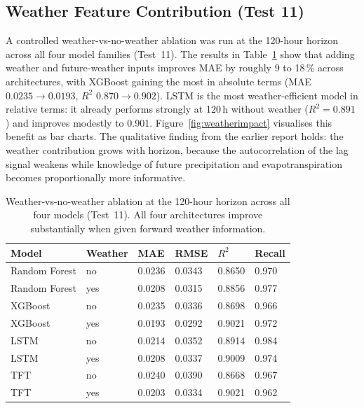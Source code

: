 \documentclass[12pt, a4paper]{article}
\begin{document}
\subsection{Weather Feature Contribution (Test 11)}

A controlled weather-vs-no-weather ablation was run at the 120-hour horizon
across all four model families (Test~11). The results in
Table~\ref{tab:weather_ablation} show that adding weather and future-weather
inputs improves MAE by roughly 9 to 18\,\% across architectures, with XGBoost
gaining the most in absolute terms (MAE $0.0235 \to 0.0193$, $R^2$
$0.870 \to 0.902$). LSTM is the most weather-efficient model in relative
terms: it already performs strongly at 120\,h without weather ($R^2 = 0.891$)
and improves modestly to 0.901. Figure~\ref{fig:weatherimpact} visualises this
benefit as bar charts. The qualitative finding from the earlier report holds:
the weather contribution grows with horizon, because the autocorrelation of
the lag signal weakens while knowledge of future precipitation and
evapotranspiration becomes proportionally more informative.

\begin{table}[H]
\centering
\caption{Weather-vs-no-weather ablation at the 120-hour horizon across all
four models (Test~11). All four architectures improve substantially when given
forward weather information.}
\label{tab:weather_ablation}
\begin{tabularx}{\linewidth}{lXXXXX}
\toprule
\textbf{Model} & \textbf{Weather} & \textbf{MAE} & \textbf{RMSE} & \textbf{$R^2$} & \textbf{Recall} \\
\midrule
Random Forest & no  & 0.0236 & 0.0343 & 0.8650 & 0.970 \\
Random Forest & yes & 0.0208 & 0.0315 & 0.8856 & 0.977 \\
XGBoost       & no  & 0.0235 & 0.0336 & 0.8698 & 0.966 \\
XGBoost       & yes & 0.0193 & 0.0292 & 0.9021 & 0.972 \\
LSTM          & no  & 0.0214 & 0.0352 & 0.8914 & 0.984 \\
LSTM          & yes & 0.0208 & 0.0337 & 0.9009 & 0.974 \\
TFT           & no  & 0.0240 & 0.0390 & 0.8668 & 0.967 \\
TFT           & yes & 0.0203 & 0.0334 & 0.9021 & 0.962 \\
\bottomrule
\end{tabularx}
\end{table}
\end{document}

